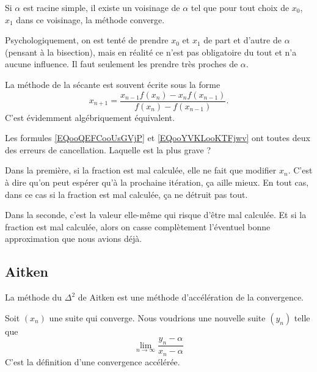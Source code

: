 \begin{proposition}
    Si \( \alpha\) est racine simple, il existe un voisinage de \( \alpha\) tel que pour tout choix de \( x_0\), \( x_1\) dans ce voisinage, la méthode converge.
\end{proposition}

Psychologiquement, on est tenté de prendre \( x_0\) et \( x_1\) de part et d'autre de \( \alpha\) (pensant à la bisection), mais en réalité ce n'est pas obligatoire du tout et n'a aucune influence. Il faut seulement les prendre très proches de \( \alpha\).

\begin{remark}
    La méthode de la sécante est souvent écrite sous la forme
    \begin{equation}        \label{EQooYVKLooKTFjwv}
        x_{n+1}=\frac{ x_{n-1}f(x_n)-x_nf(x_{n-1}) }{ f(x_n)-f(x_{n-1}) }.
    \end{equation}
    C'est évidemment algébriquement équivalent. 

    Les formules \eqref{EQooQEFCooUsGVjP} et \eqref{EQooYVKLooKTFjwv} ont toutes deux des erreurs de cancellation. Laquelle est la plus grave ?

    Dans la première, si la fraction est mal calculée, elle ne fait que modifier \( x_n\). C'est à dire qu'on peut espérer qu'à la prochaine itération, ça aille mieux. En tout cas, dans ce cas si la fraction est mal calculée, ça ne détruit pas tout.

    Dans la seconde, c'est la valeur elle-même qui risque d'être mal calculée. Et si la fraction est mal calculée, alors on casse complètement l'éventuel bonne approximation que nous avions déjà.
\end{remark}

\subsection{Aitken}

La méthode du \( \Delta^2\) de Aitken est une méthode d'accélération de la convergence.

Soit \( (x_n)\) une suite qui converge. Nous voudrions une nouvelle suite \( (y_n)\) telle que
\begin{equation}
    \lim_{n\to \infty} \frac{ y_n-\alpha }{ x_n-\alpha }
\end{equation}
C'est la définition d'une convergence accélérée.

